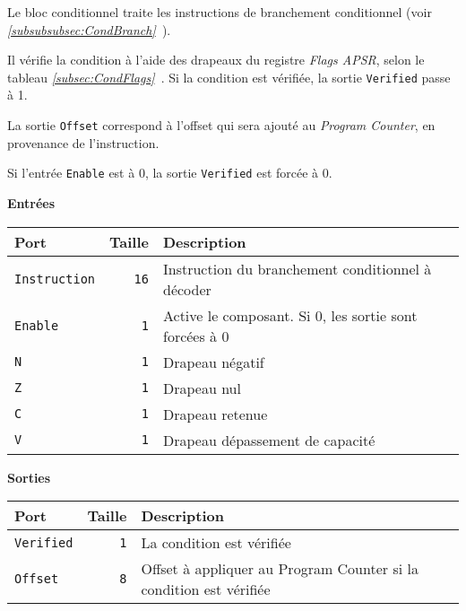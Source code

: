 
Le bloc conditionnel traite les instructions de branchement conditionnel (voir \textit{\ref{subsubsubsec:CondBranch}~}).

Il vérifie la condition à l'aide des drapeaux du registre \textit{Flags APSR}, selon le tableau  \textit{\ref{subsec:CondFlags}~}.
Si la condition est vérifiée, la sortie \texttt{Verified} passe à 1.

La sortie \texttt{Offset} correspond à l'offset qui sera ajouté au \textit{Program Counter}, en provenance de l'instruction.

Si l'entrée \texttt{Enable} est à 0, la sortie \texttt{Verified} est forcée à 0.


\textbf{Entrées}\\

\begin{tabular}{|l|r|l|}
\hline
\textbf{Port}		& \textbf{Taille} & \textbf{Description}\\
\hline

\texttt{Instruction}	& \texttt{16} & Instruction du branchement conditionnel à décoder\\
\hline
\texttt{Enable}		&  \texttt{1} & Active le composant. Si 0, les sortie sont forcées à 0\\
\hline
\texttt{N}		&  \texttt{1} & Drapeau négatif\\
\hline
\texttt{Z}		&  \texttt{1} & Drapeau nul\\
\hline
\texttt{C}		&  \texttt{1} & Drapeau retenue\\
\hline
\texttt{V}		&  \texttt{1} & Drapeau dépassement de capacité\\


\hline
\end{tabular}

\vspace{1em}
\textbf{Sorties}\\

\begin{tabular}{|l|r|l|}
\hline 
\textbf{Port} & \textbf{Taille} & \textbf{Description}\\

\hline
\texttt{Verified}	&  \texttt{1} & La condition est vérifiée\\
\hline
\texttt{Offset}		&  \texttt{8} & Offset à appliquer au Program Counter si la condition est vérifiée\\

\hline
\end{tabular}



